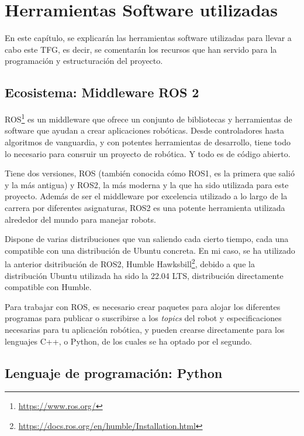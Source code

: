 \chapter{Herramientas Software utilizadas}\label{cap:herramientas}

 En este capítulo, se explicarán las herramientas software utilizadas para llevar a cabo este TFG, es decir, se comentarán los recursos que han servido para la programación y estructuración del proyecto.

\section{Ecosistema: Middleware ROS 2}

ROS\footnote{\url{https://www.ros.org/}} es un middleware que ofrece un conjunto de bibliotecas y herramientas de software que ayudan a crear aplicaciones robóticas. Desde controladores hasta algoritmos de vanguardia, y con potentes herramientas de desarrollo, tiene todo lo necesario para consruir un proyecto de robótica. Y todo es de código abierto.

Tiene dos versiones, ROS (también conocida cómo ROS1, es la primera que salió y la más antigua) y ROS2, la más moderna y la que ha sido utilizada para este proyecto. Además de ser el middleware por excelencia utilizado a lo largo de la carrera por diferentes asignaturas, ROS2 es una potente herramienta utilizada alrededor del mundo para manejar robots.

Dispone de varias distribuciones que van saliendo cada cierto tiempo, cada una compatible con una distribución de Ubuntu concreta. En mi caso, se ha utilizado la anterior dsitribución de ROS2, Humble Hawksbill\footnote{\url{https://docs.ros.org/en/humble/Installation.html}}, debido a que la distribución Ubuntu utilizada ha sido la 22.04 LTS, distribución directamente compatible con Humble.

Para trabajar con ROS, es necesario crear paquetes \cite{tutorial_paquete} para alojar los diferentes programas para publicar o suscribirse a los \textit{topics} del robot \cite{tutorial_pubsub} y especificaciones necesarias para tu aplicación robótica, y pueden crearse directamente para los lenguajes C++, o Python, de los cuales se ha optado por el segundo.

\section{Lenguaje de programación: Python}

